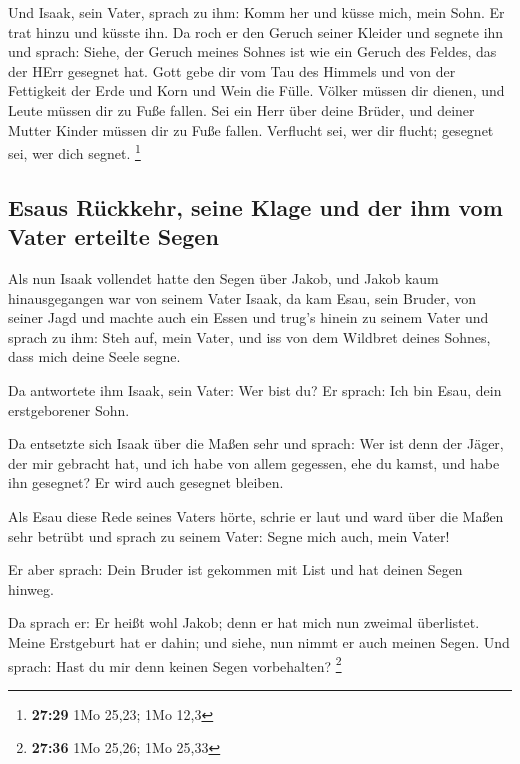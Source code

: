  Und Isaak, sein Vater, sprach zu ihm: Komm her und küsse
mich, mein Sohn.  Er trat hinzu und küsste ihn. Da roch
er den Geruch seiner Kleider und segnete ihn und sprach: Siehe, der
Geruch meines Sohnes ist wie ein Geruch des Feldes, das der HErr
gesegnet hat.  Gott gebe dir vom Tau des Himmels und von
der Fettigkeit der Erde und Korn und Wein die Fülle. 
Völker müssen dir dienen, und Leute müssen dir zu Fuße fallen. Sei ein
Herr über deine Brüder, und deiner Mutter Kinder müssen dir zu Fuße
fallen. Verflucht sei, wer dir flucht; gesegnet sei, wer dich segnet.
\footnote{\textbf{27:29} 1Mo 25,23; 1Mo 12,3}

\hypertarget{esaus-ruxfcckkehr-seine-klage-und-der-ihm-vom-vater-erteilte-segen}{%
\subsection{Esaus Rückkehr, seine Klage und der ihm vom Vater erteilte
Segen}\label{esaus-ruxfcckkehr-seine-klage-und-der-ihm-vom-vater-erteilte-segen}}

 Als nun Isaak vollendet hatte den Segen über Jakob, und
Jakob kaum hinausgegangen war von seinem Vater Isaak, da kam Esau, sein
Bruder, von seiner Jagd  und machte auch ein Essen und
trug's hinein zu seinem Vater und sprach zu ihm: Steh auf, mein Vater,
und iss von dem Wildbret deines Sohnes, dass mich deine Seele segne.

 Da antwortete ihm Isaak, sein Vater: Wer bist du? Er
sprach: Ich bin Esau, dein erstgeborener Sohn.

 Da entsetzte sich Isaak über die Maßen sehr und sprach:
Wer ist denn der Jäger, der mir gebracht hat, und ich habe von allem
gegessen, ehe du kamst, und habe ihn gesegnet? Er wird auch gesegnet
bleiben.

 Als Esau diese Rede seines Vaters hörte, schrie er laut
und ward über die Maßen sehr betrübt und sprach zu seinem Vater: Segne
mich auch, mein Vater!

 Er aber sprach: Dein Bruder ist gekommen mit List und
hat deinen Segen hinweg.

 Da sprach er: Er heißt wohl Jakob; denn er hat mich nun
zweimal überlistet. Meine Erstgeburt hat er dahin; und siehe, nun nimmt
er auch meinen Segen. Und sprach: Hast du mir denn keinen Segen
vorbehalten? \footnote{\textbf{27:36} 1Mo 25,26; 1Mo 25,33}

